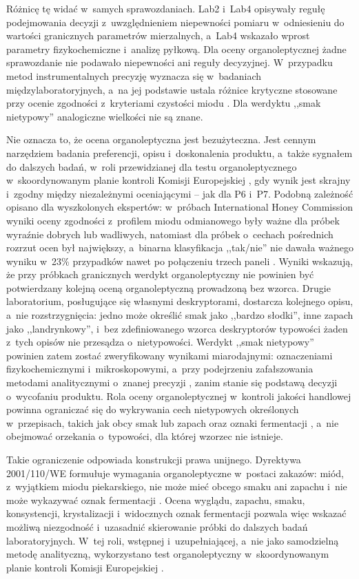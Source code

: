 Różnicę tę widać w~samych sprawozdaniach. Lab2 i~Lab4 opisywały
regułę podejmowania decyzji z~uwzględnieniem niepewności pomiaru
\cite[pkt~7.8.6]{ISO17025} w~odniesieniu do wartości granicznych parametrów
mierzalnych, a~Lab4 wskazało wprost parametry fizykochemiczne
i~analizę pyłkową. Dla oceny organoleptycznej żadne sprawozdanie nie
podawało niepewności ani reguły decyzyjnej. W~przypadku metod
instrumentalnych precyzję wyznacza się w~badaniach międzylaboratoryjnych,
a~na jej podstawie ustala różnice krytyczne stosowane przy ocenie zgodności
z~kryteriami czystości miodu \cite{Ulberth2024}. Dla werdyktu ,,smak
nietypowy'' analogiczne wielkości nie są znane.

Nie oznacza to, że ocena organoleptyczna jest bezużyteczna. Jest cennym
narzędziem badania preferencji, opisu i~doskonalenia produktu, a~także
sygnałem do dalszych badań, w~roli przewidzianej dla testu organoleptycznego
w~skoordynowanym planie kontroli Komisji Europejskiej
\cite{KE2015PlanKontroli}, gdy wynik jest skrajny i~zgodny między
niezależnymi oceniającymi -- jak dla P6 i~P7. Podobną zależność opisano dla
wyszkolonych ekspertów: w~próbach International Honey Commission wyniki
oceny zgodności z~profilem miodu odmianowego były ważne dla próbek wyraźnie
dobrych lub wadliwych, natomiast dla próbek o~cechach pośrednich rozrzut
ocen był największy, a~binarna klasyfikacja ,,tak/nie'' nie dawała ważnego
wyniku w~23\% przypadków nawet po połączeniu trzech paneli
\cite{Piana2004}. Wyniki wskazują, że przy próbkach
granicznych werdykt organoleptyczny nie powinien być potwierdzany kolejną
oceną organoleptyczną prowadzoną bez wzorca. Drugie laboratorium,
posługujące się własnymi deskryptorami, dostarcza kolejnego opisu, a~nie
rozstrzygnięcia: jedno może określić smak jako ,,bardzo słodki'', inne
zapach jako ,,landrynkowy'', i~bez zdefiniowanego wzorca deskryptorów
typowości żaden z~tych opisów nie przesądza o~nietypowości. Werdykt ,,smak
nietypowy'' powinien zatem zostać zweryfikowany wynikami miarodajnymi:
oznaczeniami fizykochemicznymi i~mikroskopowymi, a~przy podejrzeniu
zafałszowania metodami analitycznymi o~znanej precyzji \cite{Ulberth2024},
zanim stanie się podstawą decyzji o~wycofaniu produktu. Rola oceny
organoleptycznej w~kontroli jakości handlowej powinna ograniczać się do
wykrywania cech nietypowych określonych w~przepisach, takich jak obcy smak
lub zapach oraz oznaki fermentacji
\cite{Dyrektywa2001110,RozporzadzenieMRiRW2009}, a~nie obejmować orzekania
o~typowości, dla której wzorzec nie istnieje.

Takie ograniczenie odpowiada konstrukcji prawa unijnego.
Dyrektywa 2001/110/WE formułuje wymagania organoleptyczne w~postaci
zakazów: miód, z~wyjątkiem miodu piekarskiego, nie może mieć obcego smaku
ani zapachu i~nie może wykazywać oznak fermentacji \cite{Dyrektywa2001110}.
Ocena wyglądu, zapachu, smaku, konsystencji, krystalizacji i~widocznych
oznak fermentacji pozwala więc wskazać możliwą niezgodność i~uzasadnić
skierowanie próbki do dalszych badań laboratoryjnych. W~tej roli,
wstępnej i~uzupełniającej, a~nie jako samodzielną metodę analityczną,
wykorzystano test organoleptyczny w~skoordynowanym planie kontroli
Komisji Europejskiej \cite{KE2015PlanKontroli}.

